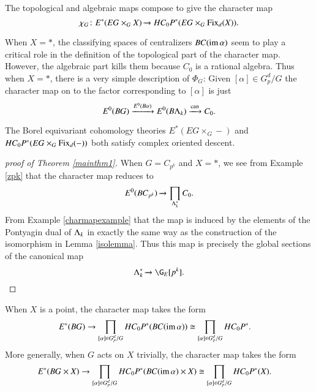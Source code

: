 The topological and algebraic maps compose to give the character map
\[
\chi_G \colon E^*(EG \times_G X) \xrightarrow{} HC_{0}P^{*}(EG \times_G \operatorname{Fix}_d(X)).
\]


\begin{example} \label{charmapexample}
When $X = \ast$, the classifying spaces of centralizers $BC(\operatorname{im} \alpha)$ seem to play a critical role in the definition of the topological part of the character map. However, the algebraic part kills them because $C_0$ is a rational algebra. Thus when $X = \ast$, there is a very simple description of $\Phi_G$: Given $[\alpha] \in G_{p}^{d}/G$ the character map on to the factor corresponding to $[\alpha]$ is just
\[
E^0(BG) \xrightarrow{E^0(B\alpha)} E^0(B\Lambda_k) \xrightarrow{\text{can}} C_0.
\]
\end{example}


\begin{proposition}
The Borel equivariant cohomology theories $E^*(EG \times_G -)$ and $HC_{0}P^{*}(EG \times_G \operatorname{Fix}_d(-))$ both satisfy complex oriented descent.
\end{proposition}


\begin{proof}[proof of Theorem \ref{mainthm1}]
When $G = C_{p^k}$ and $X = \ast$, we see from Example \ref{zpk} that the character map reduces to
\[
E^0(BC_{p^k}) \xrightarrow{} \prod_{\Lambda_k^*}C_{0}.
\]
From Example \ref{charmapexample} that the map is induced by the elements of the Pontyagin dual of $\Lambda_k$ in exactly the same way as the construction of the isomorphism in Lemma \ref{isolemma}. Thus this map is precisely the global sections of the canonical map
\[
\Lambda_{k}^* \xrightarrow{} \G_{E}[p^k]. \qedhere
\]
\end{proof}



\begin{example} \label{trivG}
When $X$ is a point, the character map takes the form
\begin{align*}
E^*(BG) & \to \prod_{[\alpha] \in G_{p}^{d}/G} HC_0P^*(BC(\operatorname{im} \alpha)) \cong \prod_{[\alpha] \in G_{p}^{d}/G} HC_0P^*.
\end{align*}
More generally, when $G$ acts on $X$ trivially, the character map takes the form
\begin{align*}
E^*(BG \times X) & \to \prod_{[\alpha] \in G_{p}^{d}/G} HC_{0}P^{*}(BC(\operatorname{im} \alpha) \times X) \cong \prod_{[\alpha] \in G_{p}^{d}/G} HC_{0}P^{*}(X).
\end{align*}
\end{example}

